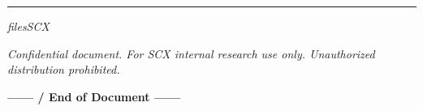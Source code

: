 \documentclass[12pt,a4paper]{article}
\theoremstyle{remark}
\begin{document}

\vspace{2em}
\begin{center}
\rule{0.5\textwidth}{0.5pt}

\vspace{1em}
\textit{filesSCX}

\textit{Confidential document. For SCX internal research use only. Unauthorized distribution prohibited.}

\vspace{1em}
\textbf{——  / End of Document ——}
\end{center}
\end{document}
